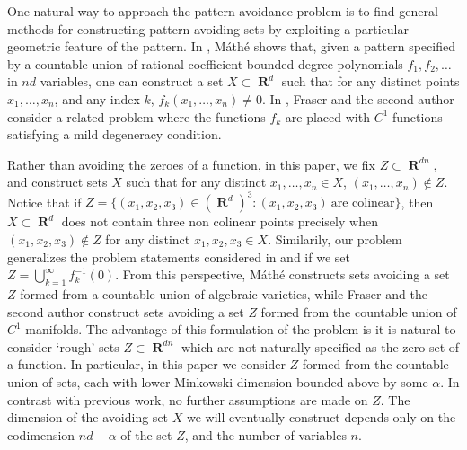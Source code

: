 \documentclass[dvipsnames,letterpaper,12pt]{article}
\theoremstyle{plain}
\DeclareMathOperator{\RR}{\mathbf{R}}
\begin{document}
One natural way to approach the pattern avoidance problem is to find general methods for constructing pattern avoiding sets by exploiting a particular geometric feature of the pattern. In \cite{Mathe}, M\'{a}th\'{e} shows that, given a pattern specified by a countable union of rational coefficient bounded degree polynomials $f_1, f_2, \dots$ in $nd$ variables, one can construct a set $X \subset \RR^d$ such that for any distinct points $x_1, \dots, x_n$, and any index $k$, $f_k(x_1, \dots, x_n) \neq 0$. In \cite{MalabikaRob}, Fraser and the second author consider a related problem where the functions $f_k$ are placed with $C^1$ functions satisfying a mild degeneracy condition.



Rather than avoiding the zeroes of a function, in this paper, we fix $Z \subset \RR^{dn}$, and construct sets $X$ such that for any distinct $x_1, \dots, x_n \in X$, $(x_1, \dots, x_n) \not \in Z$. Notice that if $Z = \{ (x_1,x_2,x_3) \in (\RR^d)^3 : (x_1,x_2,x_3)\ \text{are colinear} \}$, then $X \subset \RR^d$ does not contain three non colinear points precisely when $(x_1,x_2,x_3) \not \in Z$ for any distinct $x_1,x_2,x_3 \in X$. Similarily, our problem generalizes the problem statements considered in \cite{Mathe} and \cite{MalabikaRob} if we set $Z = \bigcup_{k = 1}^\infty f_k^{-1}(0)$. From this perspective, M\'{a}th\'{e} constructs sets avoiding a set $Z$ formed from a countable union of algebraic varieties, while Fraser and the second author construct sets avoiding a set $Z$ formed from the countable union of $C^1$ manifolds. The advantage of this formulation of the problem is it is natural to consider `rough' sets $Z \subset \RR^{dn}$ which are not naturally specified as the zero set of a function. In particular, in this paper we consider $Z$ formed from the countable union of sets, each with lower Minkowski dimension bounded above by some $\alpha$. In contrast with previous work, no further assumptions are made on $Z$. The dimension of the avoiding set $X$ we will eventually construct depends only on the codimension $nd - \alpha$ of the set $Z$, and the number of variables $n$.
\end{document}
